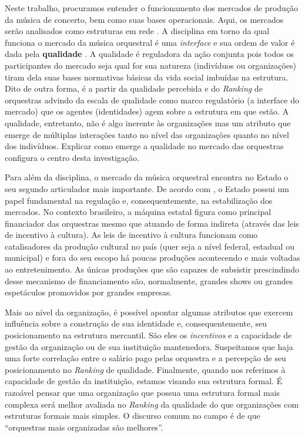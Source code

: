 \documentclass[a4paper, 12pt, openright, oneside, german, french, english, brazil]{abntex2}
\begin{document}
	Neste trabalho, procuramos entender o funcionamento dos mercados de produção da música de concerto, bem como suas bases operacionais. Aqui, os mercados serão analisados como estruturas em rede \cite{white2002markets}. A disciplina em torno da qual funciona o mercado da música orquestral é uma \textit{interface} e sua ordem de valor é dada pela \textbf{qualidade} \cite{white2002markets}. A qualidade é reguladora da ação conjunta pois todos os participantes do mercado seja qual for sua natureza (indivíduos ou organizações) tiram dela suas bases normativas básicas da vida social imbuídas na estrutura. Dito de outra forma, é a partir da qualidade percebida e do \textit{Ranking} de orquestras advindo da escala de qualidade como marco regulatório (a interface do mercado) que os agentes (identidades) agem sobre a estrutura em que estão. A qualidade, entretanto, não é algo inerente às organizações mas um atributo que emerge de múltiplas interações tanto no nível das organizações quanto no nível dos indivíduos. Explicar como emerge a qualidade no mercado das orquestras configura o centro desta investigação.

	Para além da disciplina, o mercado da música orquestral encontra no Estado o seu segundo articulador mais importante.	De acordo com , o Estado possui um papel fundamental na regulação e, consequentemente, na estabilização dos mercados. No contexto brasileiro, a máquina estatal figura como principal financiador das orquestras mesmo que atuando de forma indireta (através das leis de incentivo à cultura). As leis de incentivo à cultura funcionam como catalisadores da produção cultural no país (quer seja a nível federal, estadual ou municipal) e fora do seu escopo há poucas produções acontecendo e mais voltadas ao entretenimento. As únicas produções que são capazes de subsistir prescindindo desse mecanismo de financiamento são, normalmente, grandes shows ou grandes espetáculos promovidos por grandes empresas.

	Mais ao nível da organização, é possível apontar algumas atributos que exercem influência sobre a construção de sua identidade e, consequentemente, seu posicionamento na estrutura mercantil. São eles os \textit{incentivos} e a capacidade de gestão da organização ou de sua instituição mantenedora. Suspeitamos que haja uma forte correlação entre o salário pago pelas orquestra e a percepção de seu posicionamento no \textit{Ranking} de qualidade. 
	Finalmente, quando nos referimos à capacidade de gestão da instituição, estamos visando sua estrutura formal. É razoável pensar que uma organização que possua uma estrutura formal mais complexa será melhor avaliada no \textit{Ranking} da qualidade do que organizações com estruturas formais mais simples. O discurso comum no campo é de que ``orquestras mais organizadas são melhores''.
\end{document}
